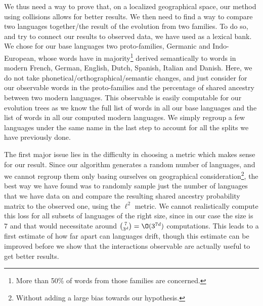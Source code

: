 \documentclass[math, info, english]{cours}
\begin{document}
We thus need a way to prove that, on a localized geographical space, our method using collisions allows for better results.
We then need to find a way to compare two languages together/the result of the evolution from two families.
To do so, and try to connect our results to observed data, we have used \cite{evosem} as a lexical bank.
We chose for our base languages two proto-families, Germanic and Indo-European, whose words have in majority\footnote{More than 50\% of words from those families are concerned.}
derived semantically to words in modern French, German, English, Dutch, Spanish, Italian and Danish.
Here, we do not take phonetical/orthographical/semantic changes, and just consider for our observable words in the proto-families and the percentage of shared ancestry between two modern languages.
This observable is easily computable for our evolution trees as we know the full list of words in all our base languages and the list of words in all our computed modern languages.
We simply regroup a few languages under the same name in the last step to account for all the splits we have previously done.

\medskip

The first major issue lies in the difficulty in choosing a metric which makes sense for our result.
Since our algorithm generates a random number of languages, and we cannot regroup them only basing ourselves on geographical consideration\footnote{Without adding a large bias towards our hypothesis.}, the best way we have found was to randomly sample just the number of languages that we have data on and compare the resulting shared ancestry probability matrix to the observed one, using the $\ell^{2}$ metric.
We cannot realistically compute this loss for all subsets of languages of the right size, since in our case the size is $7$ and that would necessitate around $\binom{7}{3^{d}} = \O(3^{7d})$ computations.
This leads to a first estimate of how far apart can languages drift, though this estimate can be improved before we show that the interactions observable are actually useful to get better results.

\medskip
\end{document}
